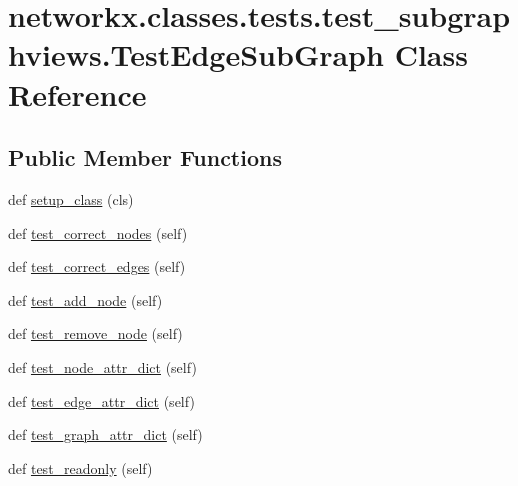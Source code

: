 \hypertarget{classnetworkx_1_1classes_1_1tests_1_1test__subgraphviews_1_1TestEdgeSubGraph}{}\section{networkx.\+classes.\+tests.\+test\+\_\+subgraphviews.\+Test\+Edge\+Sub\+Graph Class Reference}
\label{classnetworkx_1_1classes_1_1tests_1_1test__subgraphviews_1_1TestEdgeSubGraph}
\subsection*{Public Member Functions}
\begin{DoxyCompactItemize}
\item 
def \hyperlink{classnetworkx_1_1classes_1_1tests_1_1test__subgraphviews_1_1TestEdgeSubGraph_a4ad26a0809f2b3fc80d99c4dd2fe38cc}{setup\+\_\+class} (cls)
\item 
def \hyperlink{classnetworkx_1_1classes_1_1tests_1_1test__subgraphviews_1_1TestEdgeSubGraph_a21c7e34d5b1221fbe0ae7e329e33bf8c}{test\+\_\+correct\+\_\+nodes} (self)
\item 
def \hyperlink{classnetworkx_1_1classes_1_1tests_1_1test__subgraphviews_1_1TestEdgeSubGraph_a589b6aca311f06dce2a4977b4dd090c7}{test\+\_\+correct\+\_\+edges} (self)
\item 
def \hyperlink{classnetworkx_1_1classes_1_1tests_1_1test__subgraphviews_1_1TestEdgeSubGraph_a2afdf0d260faa5c377ddae2c83f5e547}{test\+\_\+add\+\_\+node} (self)
\item 
def \hyperlink{classnetworkx_1_1classes_1_1tests_1_1test__subgraphviews_1_1TestEdgeSubGraph_a8374955afe236108d49e0c78be13dd49}{test\+\_\+remove\+\_\+node} (self)
\item 
def \hyperlink{classnetworkx_1_1classes_1_1tests_1_1test__subgraphviews_1_1TestEdgeSubGraph_a1703076a4616b3ddd54e4f3652baa13b}{test\+\_\+node\+\_\+attr\+\_\+dict} (self)
\item 
def \hyperlink{classnetworkx_1_1classes_1_1tests_1_1test__subgraphviews_1_1TestEdgeSubGraph_a30f338c3a5dac7ada5c0ae7165a507d8}{test\+\_\+edge\+\_\+attr\+\_\+dict} (self)
\item 
def \hyperlink{classnetworkx_1_1classes_1_1tests_1_1test__subgraphviews_1_1TestEdgeSubGraph_ab589f6cb13c4d483c761f1bdf9011fcd}{test\+\_\+graph\+\_\+attr\+\_\+dict} (self)
\item 
def \hyperlink{classnetworkx_1_1classes_1_1tests_1_1test__subgraphviews_1_1TestEdgeSubGraph_a013a40366a5ae6027662066f8e4c5da0}{test\+\_\+readonly} (self)
\end{DoxyCompactItemize}
